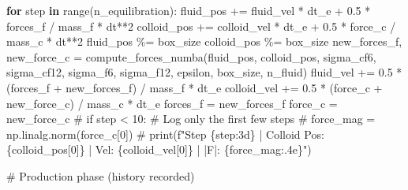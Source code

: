 \documentclass[
  letterpaper,
  enabledeprecatedfontcommands]{report}
\newenvironment{Shaded}{\begin{snugshade}}{\end{snugshade}}
\newcommand{\BuiltInTok}[1]{\textcolor[rgb]{0.00,0.23,0.31}{#1}}
\newcommand{\CommentTok}[1]{\textcolor[rgb]{0.37,0.37,0.37}{#1}}
\newcommand{\ControlFlowTok}[1]{\textcolor[rgb]{0.00,0.23,0.31}{\textbf{#1}}}
\newcommand{\DecValTok}[1]{\textcolor[rgb]{0.68,0.00,0.00}{#1}}
\newcommand{\FloatTok}[1]{\textcolor[rgb]{0.68,0.00,0.00}{#1}}
\newcommand{\KeywordTok}[1]{\textcolor[rgb]{0.00,0.23,0.31}{\textbf{#1}}}
\newcommand{\NormalTok}[1]{\textcolor[rgb]{0.00,0.23,0.31}{#1}}
\newcommand{\OperatorTok}[1]{\textcolor[rgb]{0.37,0.37,0.37}{#1}}
\begin{document}
\begin{Shaded}
\begin{Highlighting}[]
\ControlFlowTok{for}\NormalTok{ step }\KeywordTok{in} \BuiltInTok{range}\NormalTok{(n\_equilibration):}
\NormalTok{    fluid\_pos }\OperatorTok{+=}\NormalTok{ fluid\_vel }\OperatorTok{*}\NormalTok{ dt\_e }\OperatorTok{+} \FloatTok{0.5} \OperatorTok{*}\NormalTok{ forces\_f }\OperatorTok{/}\NormalTok{ mass\_f }\OperatorTok{*}\NormalTok{ dt}\OperatorTok{**}\DecValTok{2}
\NormalTok{    colloid\_pos }\OperatorTok{+=}\NormalTok{ colloid\_vel }\OperatorTok{*}\NormalTok{ dt\_e }\OperatorTok{+} \FloatTok{0.5} \OperatorTok{*}\NormalTok{ force\_c }\OperatorTok{/}\NormalTok{ mass\_c }\OperatorTok{*}\NormalTok{ dt}\OperatorTok{**}\DecValTok{2}
\NormalTok{    fluid\_pos }\OperatorTok{\%=}\NormalTok{ box\_size}
\NormalTok{    colloid\_pos }\OperatorTok{\%=}\NormalTok{ box\_size}
\NormalTok{    new\_forces\_f, new\_force\_c }\OperatorTok{=}\NormalTok{ compute\_forces\_numba(fluid\_pos, colloid\_pos, sigma\_cf6, sigma\_cf12, sigma\_f6, sigma\_f12, epsilon, box\_size, n\_fluid)}
\NormalTok{    fluid\_vel }\OperatorTok{+=} \FloatTok{0.5} \OperatorTok{*}\NormalTok{ (forces\_f }\OperatorTok{+}\NormalTok{ new\_forces\_f) }\OperatorTok{/}\NormalTok{ mass\_f }\OperatorTok{*}\NormalTok{ dt\_e}
\NormalTok{    colloid\_vel }\OperatorTok{+=} \FloatTok{0.5} \OperatorTok{*}\NormalTok{ (force\_c }\OperatorTok{+}\NormalTok{ new\_force\_c) }\OperatorTok{/}\NormalTok{ mass\_c }\OperatorTok{*}\NormalTok{ dt\_e}
\NormalTok{    forces\_f }\OperatorTok{=}\NormalTok{ new\_forces\_f}
\NormalTok{    force\_c }\OperatorTok{=}\NormalTok{ new\_force\_c}
    \CommentTok{\# if step \textless{} 10:  \# Log only the first few steps}
    \CommentTok{\#     force\_mag = np.linalg.norm(force\_c[0])}
    \CommentTok{\#     print(f"Step \{step:3d\} | Colloid Pos: \{colloid\_pos[0]\} | Vel: \{colloid\_vel[0]\} | |F|: \{force\_mag:.4e\}")}

\CommentTok{\# Production phase (history recorded)}


\end{Highlighting}
\end{Shaded}
\end{document}
